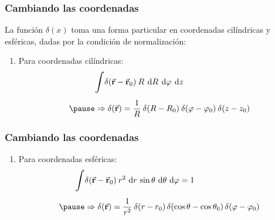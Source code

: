 \documentclass[12pt]{beamer}
\begin{document}
\begin{frame}
\frametitle{Cambiando las coordenadas}
La función $\delta (x)$ toma una forma particular en coordenadas cilíndricas y esféricas, dadas por la condición de normalización:
\pause
{}
\begin{enumerate}[<+->]
\item Para coordenadas cilíndricas:
\begin{eqnarray*}
\begin{aligned}
&\scaleint{6ex} \delta (\va{r} - \va{r}_{0}) \: R \: \dd{R} \: \dd{\varphi} \: \dd{z} \\[0.5em] \pause 
&\Rightarrow \delta (\va{r}) =  \dfrac{1}{R} \: \delta (R - R_{0}) \: \delta (\varphi - \varphi_{0}) \: \delta (z - z_{0})
\end{aligned}
\end{eqnarray*}
\seti
\end{enumerate}
\end{frame}

\begin{frame}
\frametitle{Cambiando las coordenadas}
\begin{enumerate}[<+->]
\conti
\item Para coordenadas esféricas:
\begin{eqnarray*}
\begin{aligned}
\scaleint{6ex} & \delta (\va{r} - \va{r}_{0}) \: r^{2} \, \dd{r} \, \sin \theta \, \dd{\theta} \, \dd{\varphi} = 1 \\[0.5em] \pause
&\Rightarrow \delta (\va{r}) = \dfrac{1}{r^{2}} \: \delta (r - r_{0}) \, \delta (\cos \theta - \cos \theta_{0}) \, \delta (\varphi - \varphi_{0})
\end{aligned}
\end{eqnarray*}
\end{enumerate}
\end{frame}
\end{document}
